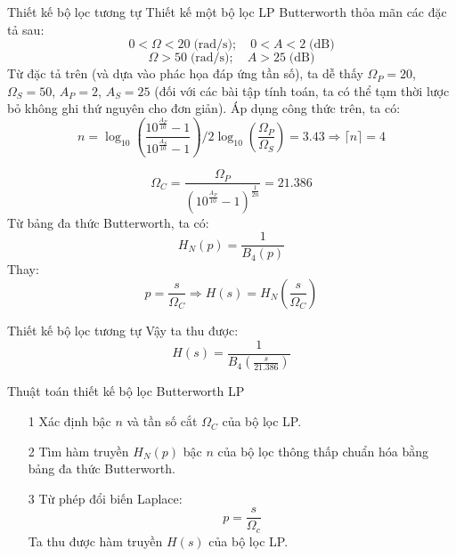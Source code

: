 \documentclass[8pt]{beamer}
\begin{document}
\begin{frame}{Thiết kế bộ lọc tương tự}
	Thiết kế một bộ lọc LP Butterworth thỏa mãn các đặc tả sau: $$0<\Omega<20\;\text{(rad/s)};\quad 0<A<2\;\text{(dB)}$$
$$\Omega>50\;\text{(rad/s)};\quad A>25\;\text{(dB)}$$
Từ đặc tả trên (và dựa vào phác họa đáp ứng tần số), ta dễ thấy $\Omega_{P}=20$, $\Omega_{S}=50$, $A_{P}=2$, $A_{S}=25$ (đối với các bài tập tính toán, ta có thể tạm thời lược bỏ không ghi thứ nguyên cho đơn giản).
Áp dụng công thức trên, ta có:
$$n=\log_{10}\left(\frac{10^{\frac{A_{P}}{10}}-1}{10^{\frac{A_{S}}{10}}-1}\right)\bigg/2\log_{10}\left(\frac{\Omega_{P}}{\Omega_{S}}\right)=3.43\Rightarrow \lceil n \rceil =4$$

$$\Omega_{C}=\frac{\Omega_{P}}{\left(10^{\frac{A_{P}}{10}}-1\right)^{\frac{1}{2n}}}=21.386$$
Từ bảng đa thức Butterworth, ta có: $$H_{N}(p)=\frac{1}{B_{4}(p)}$$
Thay: $$p=\frac{s}{\Omega_{C}}\Rightarrow H(s)=H_{N}\left(\frac{s}{\Omega_{C}}\right)$$
\end{frame}
\begin{frame}{Thiết kế bộ lọc tương tự}
	Vậy ta thu được: $$H(s)=\frac{1}{B_{4}\left(\frac{s}{21.386}\right)}$$
	\begin{block}{Thuật toán thiết kế bộ lọc Butterworth LP}
	\begin{enumerate}
		\item[1] Xác định bậc $n$ và tần số cắt $\Omega_{C}$ của bộ lọc LP.
		\item[2] Tìm hàm truyền $H_{N}(p)$ bậc $n$ của bộ lọc thông thấp chuẩn hóa bằng bảng đa thức Butterworth.
		\item[3] Từ phép đổi biến Laplace: $$p=\frac{s}{\Omega_{c}}$$ Ta thu được hàm truyền $H(s)$ của bộ lọc LP.
	\end{enumerate}
\end{block}
\end{frame}
\end{document}
